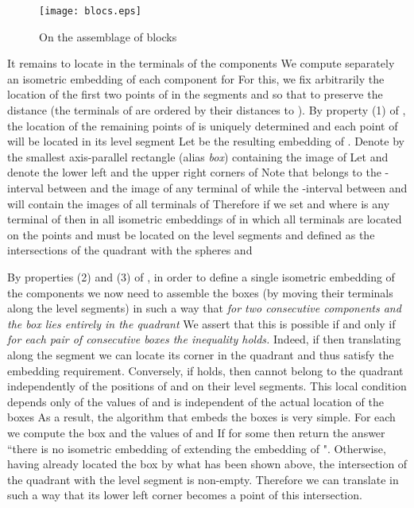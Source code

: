 \documentclass[11pt]{amsart}
\begin{document}
\begin{figure}
    \begin{center}
    \texttt{[image: blocs.eps]}
    \end{center}
    \caption{On the assemblage of blocks }
    \label{blocs}
\end{figure}


It remains to locate in  the terminals of the 
components  We compute separately an
isometric embedding of each component  for 
For this, we fix arbitrarily the location of the first two
points  of  in the segments  and  so that to
preserve the distance  (the terminals of  are ordered
by their distances to ). By property (1) of \cite{Ed}, the
location of the remaining points of  is uniquely determined and
each  point  of  will be located in its level segment 
Let  be the resulting embedding of .  Denote by
 the smallest axis-parallel rectangle (alias {\it box})
containing the image  of  Let  and 
denote the lower left and the upper right corners of   Note
that  belongs to the -interval between  and the image
 of any terminal  of  while the
-interval between  and  will contain the images of
all terminals of  Therefore if we set
 and
 where  is any
terminal of  then in all isometric embeddings of  in
which all terminals  are located on  the points
 and  must be located on the level segments  and
  defined as the intersections of the quadrant  with
the spheres  and 



By properties (2) and (3) of \cite{Ed}, in order to define a single
isometric embedding of the components  we now
need to assemble the boxes  (by moving
their terminals along the level segments) in such a way that {\it
for two consecutive components  and  the box
 lies entirely in the quadrant }  We assert
that this is possible if and only if {\it for each pair of
consecutive boxes   the
inequality  holds.}  Indeed, if
 then translating  
along the segment  we can locate its corner 
in the quadrant  and thus satisfy the embedding
requirement.  Conversely, if  holds,
then   cannot belong to the quadrant 
independently of the positions of  and  on their level
segments. This local condition depends only of the values of
 and is independent of the actual
location of the boxes   As a result, the
algorithm that embeds the boxes  is very
simple. For each  we compute the box  and
the values of  and  If
 for some  then return the
answer ``there is no isometric embedding of  extending the
embedding  of ". Otherwise, having already located
the box  by what has been shown above, the intersection of the
quadrant  with the level segment  is
non-empty. Therefore we can translate  in such a way that
its lower left corner  becomes a point of this
intersection.
\end{document}
